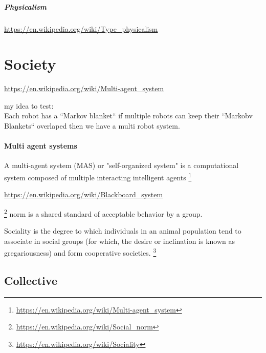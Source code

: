 \documentclass{book}
\providecommand{\seeherefooter}[1]{\footnote{\url{#1}}}
\providecommand{\clickurlfooter}[1]{\footnote{\url{#1}}}
\begin{document}
%

\paragraph{Physicalism}


\url{https://en.wikipedia.org/wiki/Type_physicalism}

\chapter{Society}


\url{https://en.wikipedia.org/wiki/Multi-agent_system}
    
    my idea to test:\\
    Each robot has a ``Markov blanket`` if multiple robots can keep their ``Markobv Blankets`` overlaped then we have a multi robot system.




    \subsubsection{Multi agent systems}
        A multi-agent system (MAS) or "self-organized system" is a computational system composed of multiple interacting intelligent agents
        \seeherefooter{https://en.wikipedia.org/wiki/Multi-agent_system}


\url{https://en.wikipedia.org/wiki/Blackboard_system}


\clickurlfooter{https://en.wikipedia.org/wiki/Social_norm} norm is a shared standard of acceptable behavior by a group.


Sociality is the degree to which individuals in an animal population tend to associate in social groups (for which, the desire or inclination is known as gregariousness) and form cooperative societies. \seeherefooter{https://en.wikipedia.org/wiki/Sociality}

\section{Collective}
\end{document}
